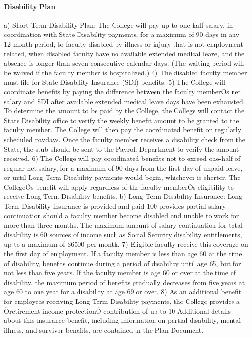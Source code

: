 \documentclass[letterpaper, 11pt]{article}
\begin{document}
			\paragraph{Disability Plan}
				a) Short-Term Disability Plan:  The College will pay up to one-half salary, in coordination with State Disability payments, for a maximum of 90 days in any 12-month period, to faculty disabled by illness or injury that is not employment related, when disabled faculty have no available extended medical leave, and the absence is longer than seven consecutive calendar days.  (The waiting period will be waived if the faculty member is hospitalized.)
				4) The disabled faculty member must file for State Disability Insurance (SDI) benefits.
				5) The College will coordinate benefits by paying the difference between the faculty memberÕs net salary and SDI after available extended medical leave days have been exhausted.  To determine the amount to be paid by the College, the College will contact the State Disability office to verify the weekly benefit amount to be granted to the faculty member.  The College will then pay the coordinated benefit on regularly scheduled paydays.  Once the faculty member receives a disability check from the State, the stub should be sent to the Payroll Department to verify the amount received.
				6) The College will pay coordinated benefits not to exceed one-half of regular net salary, for a maximum of 90 days from the first day of unpaid leave, or until Long-Term Disability payments would begin, whichever is shorter.  The CollegeÕs benefit will apply regardless of the faculty memberÕs eligibility to receive Long-Term Disability benefits.
				b) Long-Term Disability Insurance:  Long-Term Disability insurance is provided
				and paid 100%
				provides partial salary continuation should a faculty member become disabled and
				unable to work for more than three months.  The maximum amount of salary
				continuation for total disability is 60%
				sources of income such as Social Security disability entitlements, up to a
				maximum of \$6500 per month.
				7) Eligible faculty receive this coverage on the first day of employment.  If a faculty member is less than age 60 at the time of disability, benefits continue during a period of disability until age 65, but for not less than five years.  If the faculty member is age 60 or over at the time of disability, the maximum period of benefits gradually decreases from five years at age 60 to one year for a disability at age 69 or over.
				8) As an additional benefit for employees receiving Long Term Disability payments, the College provides a Òretirement income protectionÓ contribution of up to 10%
				Additional details about this insurance benefit, including information on partial disability, mental illness, and survivor benefits, are contained in the Plan Document.
\end{document}
